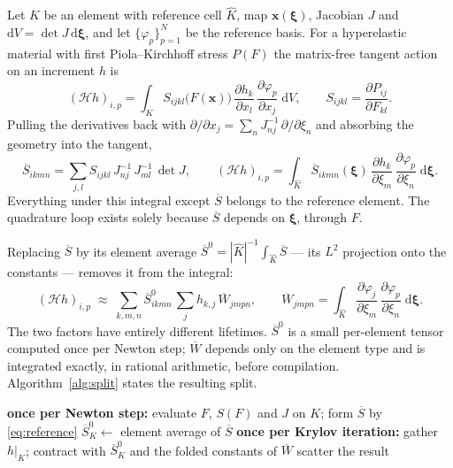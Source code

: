 \documentclass[11pt]{article}
\newcommand{\refcell}{\widehat{K}}
\newcommand{\Wbar}{\overline{W}}
\newcommand{\Sbar}{\overline{S}}
\newcommand{\xhat}{\boldsymbol{\xi}}
\begin{document}
Let $K$ be an element with reference cell $\refcell$, map
$\boldsymbol{x}(\xhat)$, Jacobian $J$ and $\mathrm{d}V = \det J\,\mathrm{d}\xhat$,
and let $\{\varphi_p\}_{p=1}^{N}$ be the reference basis.  For a hyperelastic
material with first Piola--Kirchhoff stress $P(F)$ \cite{Ogden1972,BonetWood2008}
the matrix-free tangent action on an increment $h$ is
\begin{equation}
  (\mathcal{H} h)_{i,p}
  = \int_K S_{ijkl}\bigl(F(\boldsymbol{x})\bigr)\,
    \frac{\partial h_k}{\partial x_l}\,
    \frac{\partial \varphi_p}{\partial x_j}\;\mathrm{d}V ,
  \qquad
  S_{ijkl} = \frac{\partial P_{ij}}{\partial F_{kl}} .
  \label{eq:exact}
\end{equation}
Pulling the derivatives back with $\partial/\partial x_j = \sum_n J^{-1}_{nj}\,
\partial/\partial \xi_n$ and absorbing the geometry into the tangent,
\begin{equation}
  \Sbar_{ikmn} = \sum_{j,l} S_{ijkl}\, J^{-1}_{nj}\, J^{-1}_{ml}\, \det J ,
  \qquad
  (\mathcal{H} h)_{i,p}
  = \int_{\refcell} \Sbar_{ikmn}(\xhat)\,
    \frac{\partial h_k}{\partial \xi_m}\,
    \frac{\partial \varphi_p}{\partial \xi_n}\;\mathrm{d}\xhat .
  \label{eq:reference}
\end{equation}
Everything under this integral except $\Sbar$ belongs to the reference element.
The quadrature loop exists solely because $\Sbar$ depends on $\xhat$, through $F$.

Replacing $\Sbar$ by its element average
$\Sbar^0 = |\refcell|^{-1}\int_{\refcell}\Sbar$ --- its $L^2$ projection onto the
constants --- removes it from the integral:
\begin{equation}
  (\mathcal{H} h)_{i,p}
  \;\approx\;
  \sum_{k,m,n} \Sbar^0_{ikmn}\, \sum_j h_{k,j}\, \Wbar_{jmpn} ,
  \qquad
  \Wbar_{jmpn}
  = \int_{\refcell}
    \frac{\partial \varphi_j}{\partial \xi_m}\,
    \frac{\partial \varphi_p}{\partial \xi_n}\;\mathrm{d}\xhat .
  \label{eq:projected}
\end{equation}
The two factors have entirely different lifetimes.  $\Sbar^0$ is a small
per-element tensor computed once per Newton step; $\Wbar$ depends only on the
element type and is integrated exactly, in rational arithmetic, before
compilation.  Algorithm~\ref{alg:split} states the resulting split.

\begin{algorithm}[ht]
\caption{Partial assembly by projection, within one Newton step}
\label{alg:split}
\begin{algorithmic}[1]
\State \textbf{once per Newton step:}
  \State evaluate $F$, $S(F)$ and $J$ on $K$; form $\Sbar$ by \eqref{eq:reference}
  \State $\Sbar^0_K \gets$ element average of $\Sbar$ 
\EndFor
\Statex
\State \textbf{once per Krylov iteration:}
  \State gather $h|_K$; contract with $\Sbar^0_K$ and the folded constants of $\Wbar$
  \State scatter the result 
\EndFor
\end{algorithmic}
\end{algorithm}
\end{document}
